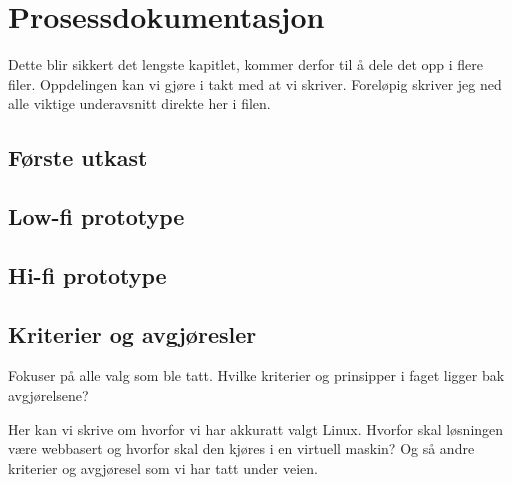 \chapter{Prosessdokumentasjon}
Dette blir sikkert det lengste kapitlet, kommer derfor til å dele det opp i flere filer. Oppdelingen kan vi gjøre i takt med at vi skriver. Foreløpig skriver jeg ned alle viktige underavsnitt direkte her i filen.

\section{Første utkast}

\section{Low-fi prototype}

\section{Hi-fi prototype}

\section{Kriterier og avgjøresler}
Fokuser på alle valg som ble tatt. Hvilke kriterier og 
prinsipper i faget ligger bak avgjørelsene? 

Her kan vi skrive om hvorfor vi har akkuratt valgt Linux. Hvorfor skal løsningen være webbasert og hvorfor skal den kjøres i en virtuell maskin? Og så andre kriterier og avgjøresel som vi har tatt under veien. 